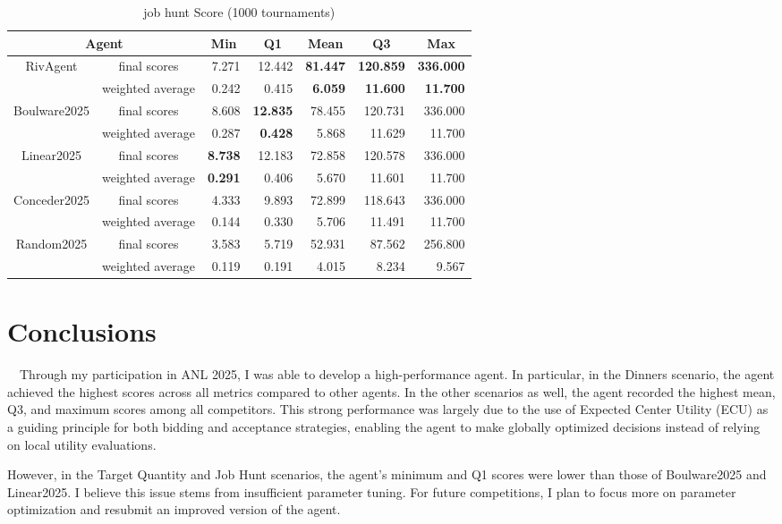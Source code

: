 \documentclass{article}
\begin{document}
\begin{table}[H]
	\centering
	\caption{job hunt Score (1000 tournaments)}
	\label{tb:job-score}
	\begin{tabular}{|c|c|r|r|r|r|r|}\hline
		\multicolumn{2}{|c|}{Agent}&\multicolumn{1}{c|}{Min}&\multicolumn{1}{c|}{Q1}&\multicolumn{1}{c|}{Mean}&\multicolumn{1}{c|}{Q3}&\multicolumn{1}{c|}{Max}\\\hline
		RivAgent & final scores & 7.271 & 12.442 & \textbf{81.447} & \textbf{120.859} & \textbf{336.000} \\\cline{2-7}
		         & weighted average & 0.242 & 0.415 & \textbf{6.059} & \textbf{11.600} & \textbf{11.700} \\\hline
		Boulware2025 & final scores & 8.608 & \textbf{12.835} & 78.455 & 120.731 & 336.000 \\\cline{2-7}
		             & weighted average & 0.287 & \textbf{0.428} & 5.868 & 11.629 & 11.700 \\\hline
		Linear2025 & final scores & \textbf{8.738} & 12.183 & 72.858 & 120.578 & 336.000 \\\cline{2-7}
		           & weighted average & \textbf{0.291} & 0.406 & 5.670 & 11.601 & 11.700 \\\hline
		Conceder2025 & final scores & 4.333 & 9.893 & 72.899 & 118.643 & 336.000 \\\cline{2-7}
		             & weighted average & 0.144 & 0.330 & 5.706 & 11.491 & 11.700 \\\hline
		Random2025 & final scores & 3.583 & 5.719 & 52.931 & 87.562 & 256.800 \\\cline{2-7}
		           & weighted average & 0.119 & 0.191 & 4.015 & 8.234 & 9.567 \\\hline
	\end{tabular}
\end{table}

\section{Conclusions}
　Through my participation in ANL 2025, I was able to develop a high-performance agent.
In particular, in the Dinners scenario, the agent achieved the highest scores across all metrics compared to other agents.
In the other scenarios as well, the agent recorded the highest mean, Q3, and maximum scores among all competitors.
This strong performance was largely due to the use of Expected Center Utility (ECU) as a guiding principle for both bidding and acceptance strategies, enabling the agent to make globally optimized decisions instead of relying on local utility evaluations.

However, in the Target Quantity and Job Hunt scenarios, the agent's minimum and Q1 scores were lower than those of Boulware2025 and Linear2025.
I believe this issue stems from insufficient parameter tuning.
For future competitions, I plan to focus more on parameter optimization and resubmit an improved version of the agent.
\end{document}
